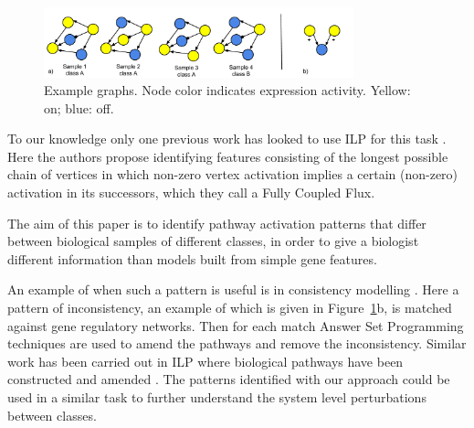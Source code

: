 \documentclass[runningheads,a4paper]{llncs}
\begin{document}
\begin{figure}
\centering
   \includegraphics[width=0.8\textwidth]{graph.pdf}
   \caption{Example graphs. Node color indicates expression activity. Yellow: on; blue: off.}
   \label{fig1}
\end{figure}


To our knowledge only one previous work has looked to use ILP for this task \citep{holec2008using}.
Here the authors propose identifying features consisting of the longest possible chain of vertices in which non-zero vertex activation implies a certain (non-zero) activation in its successors, which they call a Fully Coupled Flux.


The aim of this paper is to identify pathway activation patterns that differ between biological samples of different classes, in order to give a biologist different information than models built from simple gene features.

An example of when such a pattern is useful is in consistency modelling \citep{guziolowski2010analysis}.
Here a pattern of inconsistency, an example of which is given in Figure~\ref{fig1}b, is matched against gene regulatory networks. 
Then for each match Answer Set Programming techniques are used to amend the pathways and remove the inconsistency. Similar work has been carried out in ILP  where biological pathways have been constructed and amended \citep{ray2010automatic}.
The patterns identified with our approach could be used in a similar task to further understand the system level perturbations between classes.



\end{document}
